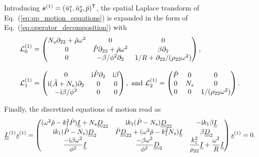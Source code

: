Introducing $ \boldsymbol s^{(1)} =(\tilde u_1^s, \tilde u_2^s, \tilde p )^\mathsf T$, the spatial Laplace transform of Eq.~(\ref{eq:up_motion_equations}) is expanded in the form of Eq.~(\ref{eq:operator_decomposition}) with
    \begin{equation}
        \begin{array}{l}
        \mathcal L_0^{(1)} =
            \begin{pmatrix}
                 N_s \partial_{22} + \hat \rho\omega^2 & 0 & 0 \\
                0 & \hat P \partial_{22} +\hat \rho\omega^2 & \beta \partial_2 \\
                0 & -\beta/\phi^2\partial_2 & 1/ R + \partial_{22}/( \rho_{22}\omega^2) 
            \end{pmatrix},\\[24pt]
        \mathcal L_1^{(1)} = 
            \begin{pmatrix}
                0 & \mathrm i\hat P \partial_2 & \mathrm i \beta \\
                \mathrm i(\hat A + N_s) \partial_2 & 0 & 0 \\
                -\mathrm i\beta/\phi^2 & 0 & 0 \\
            \end{pmatrix},\textrm{ and }
                 \mathcal L_2^{(1)}  = 
            \begin{pmatrix}
                \hat P & 0 & 0 \\
                0 &  N_s & 0 \\
                0 & 0 & 1/( \rho_{22} \omega^2)
            \end{pmatrix}.
        \end{array}
        \label{eq:up_motion_equations_decomposed}
    \end{equation}
    
Finally, the discretized equations of motion read as
    \begin{equation}   
        \underline{\underline{L}}^{(1)} \underline{s}^{(1)} = \begin{pmatrix}
            (\omega^2 \hat \rho - k_1^2 \hat P) \underline{\underline{I}} +  N_s \underline{\underline{D}}_{22}
            & \mathrm i  k_1 (\hat P -  N_s) \underline{\underline{D}}_{22} 
                & -\mathrm i k_1 \beta \underline{\underline{I}} \\
                \mathrm i  k_1 (\hat P -  N_s) \underline{\underline{D}}_2 
                & \hat P \underline{\underline{D}}_{22} +(\omega^2 \hat \rho -  k_1^2   N_s) \underline{\underline{I}}
                & \beta \underline{\underline{D}}_2 \\

                \displaystyle \frac{-\mathrm i  \beta \omega^2}{\phi^2} \underline{\underline{I}} &\displaystyle \frac{-\beta \omega^2}{\phi^2} \underline{\underline{D}}_2 & 
                \displaystyle \frac{ k_1^2}{ \rho_{22}} \underline{\underline{I}} + \displaystyle \frac{\omega^2}{ R} \underline{\underline{I}}

            \end{pmatrix} \underline{s}^{(1)} = 0. 
            \label{eq:up_motion_equations_discrete}
        \end{equation}
    
